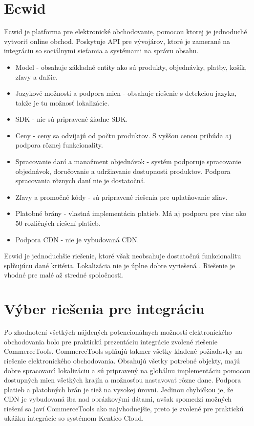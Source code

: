\documentclass[
  printed, %
  table,   %
  lof,     %
  nolot,     %
  twoside,  
]{fithesis3}
\begin{document}
\section{Ecwid}
Ecwid je platforma pre elektronické obchodovanie, pomocou ktorej je jednoduché vytvoriť online obchod. Poskytuje API pre vývojárov, ktoré je zamerané na integráciu so sociálnymi sieťamia a systémami na správu obsahu.
\begin{itemize}
	\item Model - obsahuje základné entity ako sú produkty, objednávky, platby, košík, zľavy a ďalšie. 
	\item Jazykové možnosti a podpora mien - obsahuje riešenie s detekciou jazyka, takže je tu možnosť lokalizácie.
	\item SDK - nie sú pripravené žiadne SDK.
	\item Ceny - ceny sa odvíjajú od počtu produktov. S vyššou cenou pribúda aj podpora rôznej funkcionality.
	\item Spracovanie daní a manažment objednávok - systém podporuje  spracovanie objednávok, doručovanie a udržiavanie dostupnosti produktov. Podpora spracovania rôznych daní nie je dostatočná.
	\item Zľavy a promočné kódy - sú pripravené riešenia pre uplatňovanie zliav.
	\item Platobné brány - vlastná implementácia platieb. Má aj podporu pre viac ako 50 rozličných riešení platieb.	
	\item Podpora CDN - nie je vybudovaná CDN.
		\end{itemize}
Ecwid je jednoduchšie riešenie, ktoré však neobsahuje dostatočnú funkcionalitu splňujúcu dané kritéria. Lokalizácia nie je úplne dobre vyriešená \cite{Ecwid}. Riešenie je vhodné pre malé až stredné spoločnosti.
\section{Výber riešenia pre integráciu}
Po zhodnotení všetkých nájdených potencionálnych možností elektronického obchodovania bolo pre praktickú prezentáciu integrácie zvolené riešenie CommerceTools. CommerceTools splňujú takmer všetky kladené požiadavky na riešenie elektronického obchodovania. Obsahujú všetky potrebné objekty, majú dobre spracovanú lokalizáciu a sú pripravený na globálnu implementáciu pomocou dostupných mien všetkých krajín a možnosťou nastavovať rôzne dane. Podpora platieb a platobných brán je tiež na vysokej úrovni. Jedinou chybičkou je, že CDN je vybudovaná iba nad obrázkovými dátami, avšak spomedzi možných riešení sa javí CommerceTools ako najvhodnejšie, preto je zvolené pre praktickú ukážku integrácie so systémom Kentico Cloud.
\end{document}

